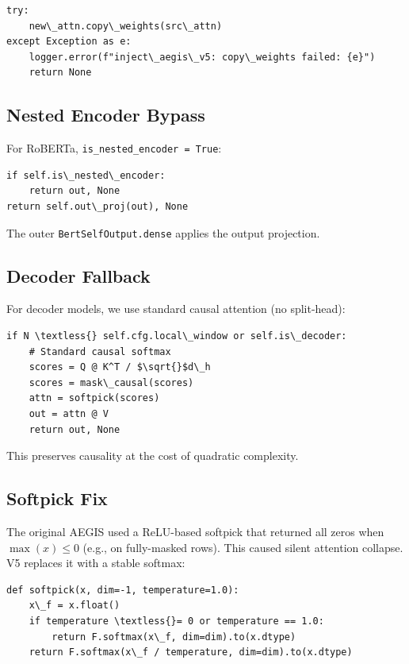 \begin{lstlisting}
try:
    new\_attn.copy\_weights(src\_attn)
except Exception as e:
    logger.error(f"inject\_aegis\_v5: copy\_weights failed: {e}")
    return None
\end{lstlisting}

\subsection{Nested Encoder Bypass}

For RoBERTa, \texttt{is\_nested\_encoder = True}:

\begin{lstlisting}
if self.is\_nested\_encoder:
    return out, None
return self.out\_proj(out), None
\end{lstlisting}

The outer \texttt{BertSelfOutput.dense} applies the output projection.

\subsection{Decoder Fallback}

For decoder models, we use standard causal attention (no split-head):

\begin{lstlisting}
if N \textless{} self.cfg.local\_window or self.is\_decoder:
    # Standard causal softmax
    scores = Q @ K^T / $\sqrt{}$d\_h
    scores = mask\_causal(scores)
    attn = softpick(scores)
    out = attn @ V
    return out, None
\end{lstlisting}

This preserves causality at the cost of quadratic complexity.

\subsection{Softpick Fix}

The original AEGIS used a ReLU-based softpick that returned all zeros when 
$\max(x) \leq 0$ (e.g., on fully-masked rows). This caused silent attention 
collapse. V5 replaces it with a stable softmax:

\begin{lstlisting}
def softpick(x, dim=-1, temperature=1.0):
    x\_f = x.float()
    if temperature \textless{}= 0 or temperature == 1.0:
        return F.softmax(x\_f, dim=dim).to(x.dtype)
    return F.softmax(x\_f / temperature, dim=dim).to(x.dtype)
\end{lstlisting}

